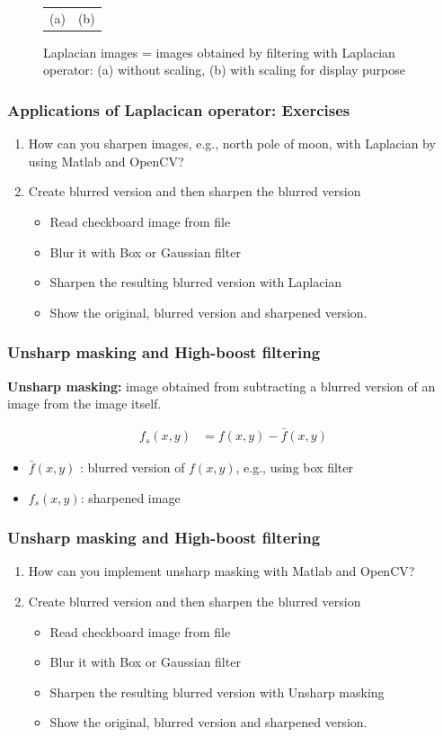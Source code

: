 \documentclass[english,11pt,table,handout]{beamer}
\begin{document}
{\begin{figure}[!h]
\begin{tabular}{cc}
			(a) & (b)
		\end{tabular}
		\centering
		\caption{Laplacian images = images obtained by filtering with Laplacian operator: (a) without scaling, (b) with scaling for display purpose}
	\end{figure}	
}
\frame
{
	\frametitle{Applications of Laplacican operator: Exercises}
	\begin{exercise}
		\begin{enumerate}
			\item How can you sharpen images, e.g., north pole of moon, with Laplacian by using Matlab and OpenCV?
			\item Create blurred version and then sharpen the blurred version
			\begin{itemize}
				\item Read checkboard image from file
				\item Blur it with Box or Gaussian filter
				\item Sharpen the resulting blurred version with Laplacian
				\item Show the original, blurred version and sharpened version.
			\end{itemize}
		\end{enumerate}
		
	\end{exercise}	
}

\frame
{
	\frametitle{Unsharp masking and High-boost filtering}
	\textbf{Unsharp masking:}  image obtained from subtracting a blurred version of an image from the image itself.
	
	\begin{align}
		\nonumber
		f_s(x,y) &= f(x,y) - \bar{f}(x,y)
	\end{align}
	\begin{itemize}
		\item $\bar{f}(x,y)$ : blurred version of $f(x,y)$, e.g., using box filter
		\item $f_s(x,y)$: sharpened image
	\end{itemize}
}
\frame
{
	\frametitle{Unsharp masking and High-boost filtering}
	\begin{exercise}
		\begin{enumerate}
			\item How can you implement unsharp masking with Matlab and OpenCV?
			\item Create blurred version and then sharpen the blurred version
			\begin{itemize}
				\item Read checkboard image from file
				\item Blur it with Box or Gaussian filter
				\item Sharpen the resulting blurred version with Unsharp masking
				\item Show the original, blurred version and sharpened version.
			\end{itemize}
		\end{enumerate}
		
	\end{exercise}
}
\end{document}
